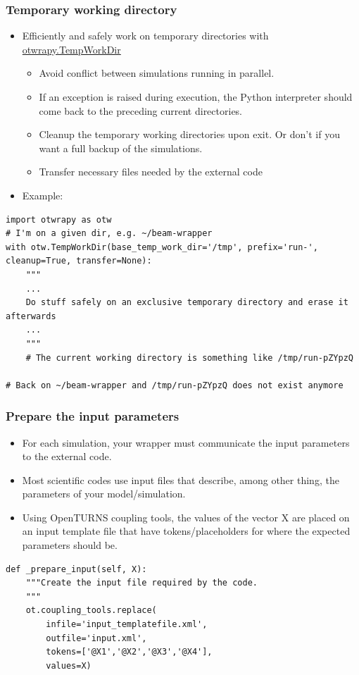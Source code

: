 \documentclass[10pt, aspectratio=169]{beamer}
\begin{document}
\begin{frame}[fragile]
\frametitle{Temporary working directory}
\begin{itemize}
\item Efficiently and safely work on temporary directories with \href{http://openturns.github.io/otwrapy/master/_generated/otwrapy.TempWorkDir.html}{otwrapy.TempWorkDir}
\begin{itemize}
\item Avoid conflict between simulations running in parallel.
\item If an exception is raised during execution, the Python interpreter
    should come back to the preceding current directories.
\item Cleanup the temporary working directories upon exit. Or don't if
    you want a full backup of the simulations.
\item Transfer necessary files needed by the external code
\end{itemize}
\item Example:
\end{itemize}
\begin{Verbatim}[xleftmargin=10mm]
import otwrapy as otw
# I'm on a given dir, e.g. ~/beam-wrapper
with otw.TempWorkDir(base_temp_work_dir='/tmp', prefix='run-', cleanup=True, transfer=None):
    """
    ...
    Do stuff safely on an exclusive temporary directory and erase it afterwards
    ...
    """
    # The current working directory is something like /tmp/run-pZYpzQ

# Back on ~/beam-wrapper and /tmp/run-pZYpzQ does not exist anymore
\end{Verbatim}
\end{frame}


\begin{frame}[fragile]
\frametitle{Prepare the input parameters}
\begin{itemize}
\item For each simulation, your wrapper must communicate the input
  parameters to the external code.
\item Most scientific codes use input files that describe, among other
  thing, the parameters of your model/simulation.
\item Using OpenTURNS coupling tools, the values of the vector X are
  placed on an input template file that have tokens/placeholders for where
  the expected parameters should be.
\end{itemize}
\begin{Verbatim}[xleftmargin=10mm]
def _prepare_input(self, X):
    """Create the input file required by the code.
    """
    ot.coupling_tools.replace(
        infile='input_templatefile.xml',
        outfile='input.xml',
        tokens=['@X1','@X2','@X3','@X4'],
        values=X)
\end{Verbatim}
\end{frame}
\end{document}
